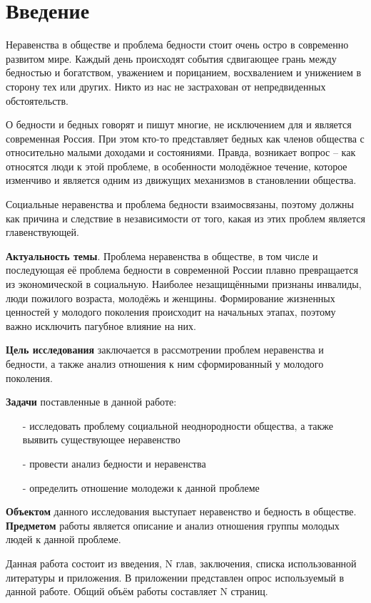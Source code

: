 \chapter*{Введение}

Неравенства в обществе и проблема бедности стоит очень остро в современно 
развитом мире. Каждый день происходят события сдвигающее грань между бедностью 
и богатством, уважением и порицанием, восхвалением и унижением в сторону тех 
или других. Никто из нас не застрахован от непредвиденных обстоятельств.

О бедности и бедных говорят и пишут многие, не исключением для и является 
современная Россия. При этом кто-то представляет бедных как членов общества с 
относительно малыми доходами и состояниями. Правда, возникает вопрос -- 
как относятся люди к этой проблеме, в особенности молодёжное течение, которое 
изменчиво и является одним из движущих механизмов в становлении общества.

Социальные неравенства и проблема бедности взаимосвязаны, поэтому должны как 
причина и следствие в независимости от того, какая из этих проблем является 
главенствующей.

\textbf{Актуальность темы}. Проблема неравенства в обществе, в том числе и 
последующая её проблема бедности в современной России плавно превращается из 
экономической в социальную. Наиболее незащищёнными признаны инвалиды, люди 
пожилого возраста, молодёжь и женщины. Формирование жизненных ценностей у 
молодого поколения происходит на начальных этапах, поэтому важно исключить 
пагубное влияние на них.

\textbf{Цель исследования} заключается в рассмотрении проблем неравенства и 
бедности, а также анализ отношения к ним сформированный у молодого поколения.  

\textbf{Задачи} поставленные в данной работе:
\begin{itemize}
    \item[-] исследовать проблему социальной неоднородности общества, а также 
        выявить существующее неравенство
    \item[-] провести анализ бедности и неравенства
    \item[-] определить отношение молодежи к данной проблеме
\end{itemize}

\textbf{Объектом} данного исследования выступает неравенство и бедность в 
обществе. \textbf{Предметом} работы является описание и анализ отношения 
группы молодых людей к данной проблеме.

Данная работа состоит из введения, N глав, заключения, списка использованной 
литературы и приложения. В приложении представлен опрос используемый в данной 
работе. Общий объём работы составляет N страниц.

\newpage